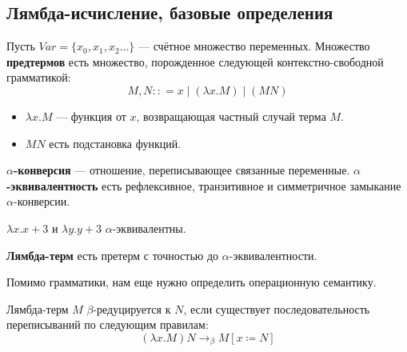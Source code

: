 \subsection{Лямбда-исчисление, базовые определения}

\begin{definition}
    Пусть \(Var = \{x_0, x_1, x_2 \dots\}\) --- счётное множество переменных. Множество \textbf{предтермов} есть множество, порожденное следующей контекстно-свободной грамматикой:
    \[M, N :: = x \mid (\lambda x.M) \mid (MN)\]
\end{definition}
\begin{remark}\itemfix
    \begin{itemize}
        \item \(\lambda x.M\) --- функция от \(x\), возвращающая частный случай терма \(M\). \?
        \item \(MN\) есть подстановка функций. \?
    \end{itemize}
\end{remark}

\begin{definition}
    \textbf{\(\alpha\)-конверсия} --- отношение, переписывающее связанные переменные. \textbf{\(\alpha\)-эквивалентность} есть рефлексивное, транзитивное и симметричное замыкание \(\alpha\)-конверсии.
\end{definition}
\begin{example}
    \(\lambda x.x + 3\) и \(\lambda y.y + 3\) \(\alpha\)-эквивалентны.
\end{example}
\begin{definition}
    \textbf{Лямбда-терм} есть претерм с точностью до \(\alpha\)-эквивалентности.
\end{definition}

Помимо грамматики, нам еще нужно определить операционную семантику.

\begin{definition}
    Лямбда-терм \(M\) \(\beta\)-редуцируется к \(N\), если существует последовательность переписываний по следующим правилам:
    \[(\lambda x.M)N \to_\beta M[x \coloneqq N]\]
    \begin{center}
        \begin{prooftree}
        \end{prooftree}
    \end{center}
    \begin{center}
        \begin{prooftree}
        \end{prooftree}
    \end{center}
\end{definition}

